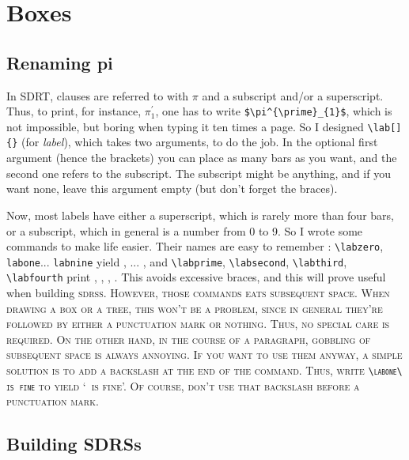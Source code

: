 \documentclass[a4paper]{article}
\begin{document}
\section{Boxes}

\subsection{Renaming pi}

In SDRT, clauses are referred to with $\pi$ and a subscript and/or a superscript. Thus, to print, for instance, $\pi^{\prime}_{1}$, one has to write \verb+$\pi^{\prime}_{1}$+, which is not impossible, but boring when typing it ten times a page. So I designed \verb+\lab[]{}+ (for \emph{label}), which takes two arguments, to do the job. In the optional first argument (hence the brackets) you can place as many bars as you want, and the second one refers to the subscript. The subscript might be anything, and if you want none, leave this argument empty (but don't forget the braces). 

Now, most labels have either a superscript, which is rarely more than four bars, or a subscript, which in general is a number from 0 to 9. So I wrote some commands to make life easier. Their names are easy to remember : \verb+\labzero+, \verb+labone+... \verb+labnine+ yield \labzero, \labone... \labnine, and \verb+\labprime+, \verb+\labsecond+, \verb+\labthird+, \verb+\labfourth+ print \labprime, \labsecond, \labthird, \labfourth. This avoids excessive braces, and this will prove useful when building \scshape sdrs\upshape s. However, those commands eats subsequent space. When drawing a box or a tree, this won't be a problem, since in general they're followed by either a punctuation mark or nothing. Thus, no special care is required. On the other hand, in the course of a paragraph, gobbling of subsequent space is always annoying. If you want to use them anyway, a simple solution is to add a backslash at the end of the command. Thus, write \verb+\labone\ is fine+ to yield `\labone\ is fine'. Of course, don't use that backslash before a punctuation mark.

\subsection{Building SDRSs}
\end{document}
